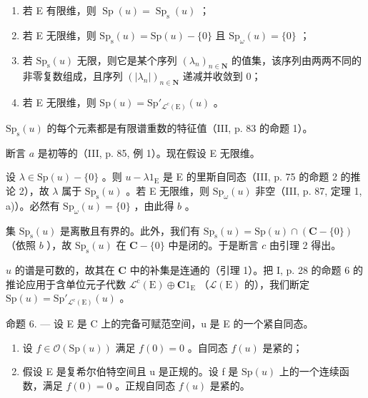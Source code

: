 \begin{enumerate}
\def\labelenumi{\alph{enumi})}
\item
  若 E 有限维，则 \(\operatorname{Sp}(u) = \operatorname{Sp}_{\mathrm{s}}(u)\) ；
\item
  若 E 无限维，则 \(\mathrm{Sp}_{\mathrm{s}}(u) = \mathrm{Sp}(u) - \{0\}\) 且 \(\mathrm{Sp}_{\omega}(u) = \{0\}\) ；
\item
  若 \(\mathrm{Sp}_{\mathrm{s}}(u)\) 无限，则它是某个序列 \((\lambda_{n})_{n\in\mathbf{N}}\) 的值集，该序列由两两不同的非零复数组成，且序列 \((|\lambda_{n}|)_{n\in\mathbf{N}}\) 递减并收敛到 0；
\item
  若 E 无限维，则 \(\mathrm{Sp}(u) = \mathrm{Sp}'_{\mathcal{L}^c (\mathrm{E})}(u)\) 。
\end{enumerate}

\(\mathrm{Sp}_{\mathrm{s}}(u)\) 的每个元素都是有限谱重数的特征值（III, p. 83 的命题 1）。

断言 \(a\) 是初等的（III, p. 85, 例 1）。现在假设 E 无限维。

设 \(\lambda \in \mathrm{Sp}(u) - \{0\}\) 。则 \(u - \lambda 1_{\mathrm{E}}\) 是 E 的里斯自同态（III, p. 75 的命题 2 的推论 2），故 \(\lambda\) 属于 \(\mathrm{Sp}_{\mathrm{s}}(u)\) 。若 E 无限维，则 \(\mathrm{Sp}_{\omega}(u)\) 非空（III, p. 87, 定理 1, a)）。必然有 \(\mathrm{Sp}_{\omega}(u) = \{0\}\) ，由此得 \(b\) 。

集 \(\mathrm{Sp}_{\mathrm{s}}(u)\) 是离散且有界的。此外，我们有 \(\mathrm{Sp}_{\mathrm{s}}(u) = \mathrm{Sp}(u) \cap (\mathbf{C} - \{0\})\) （依照 \(b\) ），故 \(\mathrm{Sp}_{\mathrm{s}}(u)\) 在 \(\mathbf{C} - \{0\}\) 中是闭的。于是断言 \(c\) 由引理 2 得出。

\(u\) 的谱是可数的，故其在 \(\mathbf{C}\) 中的补集是连通的（引理 1）。把 I, p. 28 的命题 6 的推论应用于含单位元子代数 \(\mathcal{L}^{\mathrm{c}}(\mathrm{E})\oplus \mathbf{C}1_{\mathrm{E}}\) （\(\mathcal{L}(\mathrm{E})\) 的），我们断定 \(\mathrm{Sp}(u) = \mathrm{Sp}'_{\mathcal{L}^{\mathrm{c}}(\mathrm{E})}(u)\) 。

命题 6. --- 设 E 是 C 上的完备可赋范空间，u 是 E 的一个紧自同态。

\begin{enumerate}
\def\labelenumi{\alph{enumi})}
\item
  设 \(f \in \mathcal{O}(\mathrm{Sp}(u))\) 满足 \(f(0) = 0\) 。自同态 \(f(u)\) 是紧的；
\item
  假设 E 是复希尔伯特空间且 u 是正规的。设 f 是 \(\mathrm{Sp}(u)\) 上的一个连续函数，满足 \(f(0)=0\) 。正规自同态 \(f(u)\) 是紧的。
\end{enumerate}

